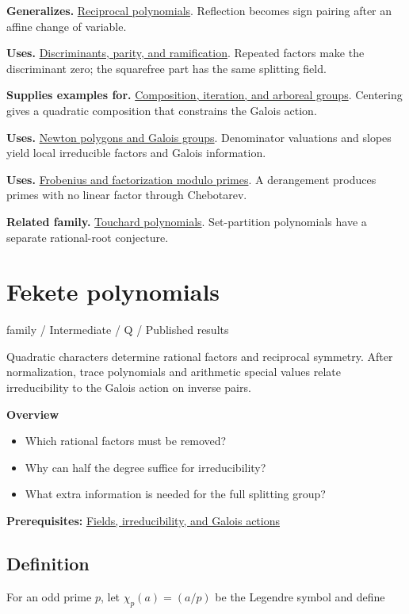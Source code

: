 \documentclass[11pt,a4paper,oneside,openany]{book}
\begin{document}
\color{black}\textbf{Generalizes.} \hyperlink{article:reciprocity}{Reciprocal polynomials}. Reflection becomes sign pairing after an affine change of variable.\par
\color{black}\textbf{Uses.} \hyperlink{article:discriminants}{Discriminants, parity, and ramification}. Repeated factors make the discriminant zero; the squarefree part has the same splitting field.\par
\color{black}\textbf{Supplies examples for.} \hyperlink{article:composition-iteration}{Composition, iteration, and arboreal groups}. Centering gives a quadratic composition that constrains the Galois action.\par
\color{black}\textbf{Uses.} \hyperlink{article:newton-polygons}{Newton polygons and Galois groups}. Denominator valuations and slopes yield local irreducible factors and Galois information.\par
\color{black}\textbf{Uses.} \hyperlink{article:frobenius}{Frobenius and factorization modulo primes}. A derangement produces primes with no linear factor through Chebotarev.\par
\color{black}\textbf{Related family.} \hyperlink{article:touchard}{Touchard polynomials}. Set-partition polynomials have a separate rational-root conjecture.\par
\endgroup
\chapter{Fekete polynomials}\label{article:fekete}\hypertarget{article:fekete}{}\color{black}
{\sffamily\small\color{atlasgold}family / Intermediate / Q / Published results}\par\medskip
Quadratic characters determine rational factors and reciprocal symmetry. After normalization, trace polynomials and arithmetic special values relate irreducibility to the Galois action on inverse pairs.\par\medskip
\textbf{Overview}\begin{itemize}
\item Which rational factors must be removed?
\item Why can half the degree suffice for irreducibility?
\item What extra information is needed for the full splitting group?
\end{itemize}
{\small\textbf{Prerequisites:} \hyperlink{article:foundations}{Fields, irreducibility, and Galois actions}}\par
{}\section{Definition}
\color{black} For an odd prime \(p\), let \(\chi_p(a)=(a/p)\) be the Legendre symbol and define\par
\end{document}
